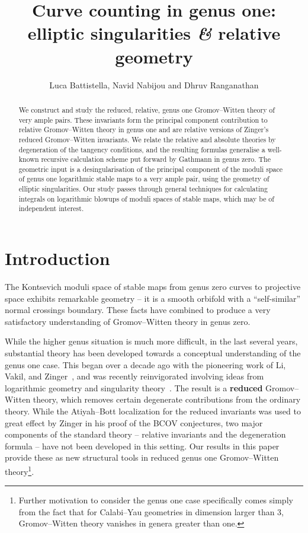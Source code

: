 \documentclass[11pt]{amsart}
\title[Curve counting in genus one: elliptic singularities and relative geometry]{Curve counting in genus one: elliptic singularities {\it \&} relative geometry}
\author{Luca Battistella, Navid Nabijou and Dhruv Ranganathan}
\date{\thismonthyear}
\theoremstyle{definition}
\theoremstyle{definition}
\begin{document}
\begin{abstract}
We construct and study the reduced, relative, genus one Gromov--Witten theory of very ample pairs. These invariants form the principal component contribution to relative Gromov--Witten theory in genus one and are relative versions of Zinger's reduced Gromov--Witten invariants. We relate the relative and absolute theories by degeneration of the tangency conditions, and the resulting formulas generalise a well-known recursive calculation scheme put forward by Gathmann in genus zero. The geometric input is a desingularisation of the principal component of the moduli space of genus one logarithmic stable maps to a very ample pair, using the geometry of elliptic singularities. Our study passes through general techniques for calculating integrals on logarithmic blowups of moduli spaces of stable maps, which may be of independent interest.
\end{abstract}

\maketitle

\appendixtitletocoff
\tableofcontents

\setcounter{section}{-1}
\section{Introduction}

The Kontsevich moduli space of stable maps from genus zero curves to projective space exhibits remarkable geometry -- it is a smooth orbifold with a ``self-similar'' normal crossings boundary. These facts have combined to produce a very {satisfactory} understanding of Gromov--Witten theory in genus zero. 

While the higher genus situation is much more difficult, in the last several years, substantial theory has been developed towards a conceptual understanding of the genus one case. This began over a decade ago with the pioneering work of Li, Vakil, and Zinger~\cite{redgone,VZ,LZ,lz2,zingerstvsred,zingred}, and was recently reinvigorated involving ideas from logarithmic geometry and singularity theory~\cite{BCM18,CM18,HL,RSPW,RSPW2,SMY1,VISC}. The result is a \textbf{reduced} Gromov--Witten theory, which removes certain degenerate contributions from the ordinary theory. While the Atiyah--Bott localization for the reduced invariants was used to great effect by Zinger in his proof of the BCOV conjectures, two major components of the standard theory -- relative invariants and the degeneration formula -- have not been developed in this setting. Our results in this paper provide these as new {structural} tools in reduced genus one Gromov--Witten theory\footnote{Further motivation to consider the genus one case specifically comes simply from the fact that for Calabi--Yau geometries in dimension larger than $3$, Gromov--Witten theory vanishes in genera greater than one.}. 
\end{document}
